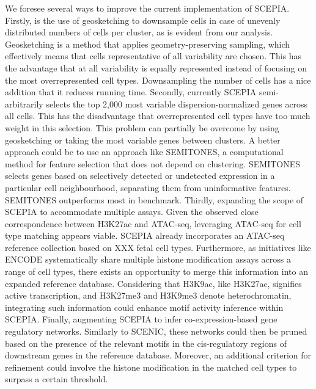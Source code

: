 We foresee several ways to improve the current implementation of SCEPIA. Firstly, is the use of geosketching to downsample cells in case of unevenly distributed numbers of cells per cluster\cite{Hie2019}, as is evident from our analysis. Geosketching is a method that applies geometry-preserving sampling, which effectively means that cells representative of all variability are chosen. This has the advantage that at all variability is equally represented instead of focusing on the most overrepresented cell types. Downsampling the number of cells has a nice addition that it reduces running time. Secondly, currently SCEPIA semi-arbitrarily selects the top 2,000 most variable dispersion-normalized genes across all cells.  This has the disadvantage that overrepresented cell types have too much weight in this selection. This problem can partially be overcome by using geosketching or taking the most variable genes between clusters. A better approach could be to use an approach like SEMITONES\cite{Vlot2022}, a computational method for feature selection that does not depend on clustering. SEMITONES selects genes based on selectively detected or undetected expression in a particular cell neighbourhood, separating them from uninformative features. SEMITONES outperforms most in benchmark. Thirdly, expanding the scope of SCEPIA to accommodate multiple assays. Given the observed close correspondence between H3K27ac and ATAC-seq, leveraging ATAC-seq for cell type matching appears viable. SCEPIA already incorporates an ATAC-seq reference collection based on XXX fetal cell types. Furthermore, as initiatives like ENCODE\cite{encode_dcc} systematically share multiple histone modification assays across a range of cell types, there exists an opportunity to merge this information into an expanded reference database. Considering that H3K9ac, like H3K27ac, signifies active transcription\cite{Roth2001}, and H3K27me3 and H3K9me3 denote heterochromatin\cite{Saksouk2015}, integrating such information could enhance motif activity inference within SCEPIA. Finally, augmenting SCEPIA to infer co-expression-based gene regulatory networks. Similarly to SCENIC, these networks could then be pruned based on the presence of the relevant motifs in the cis-regulatory regions of downstream genes in the reference database. Moreover, an additional criterion for refinement could involve the histone modification in the matched cell types to surpass a certain threshold.

